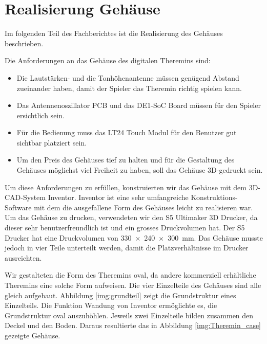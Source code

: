 \clearpage
\section{Realisierung Gehäuse}\label{sec:Realisierung Gehäuse}
Im folgenden Teil des Fachberichtes ist die Realisierung des Gehäuses beschrieben. 

Die Anforderungen an das Gehäuse des digitalen Theremins sind:
\begin{itemize}
	\item Die Lautstärken- und die Tonhöhenantenne müssen genügend Abstand zueinander haben, damit der Spieler das Theremin richtig spielen kann.
	\item Das Antennenoszillator PCB und das DE1-SoC Board müssen für den Spieler ersichtlich sein.
	\item Für die Bedienung muss das LT24 Touch Modul für den Benutzer gut sichtbar platziert sein.
	\item Um den Preis des Gehäuses tief zu halten und für die Gestaltung des Gehäuses möglichst viel Freiheit zu haben, soll das Gehäuse 3D-gedruckt sein.  
\end{itemize}

Um diese Anforderungen zu erfüllen, konstruierten wir das Gehäuse mit dem 3D-CAD-System Inventor. Inventor ist eine sehr umfangreiche Konstruktions-Software mit dem die ausgefallene Form des Gehäuses leicht zu realisieren war.
Um das Gehäuse zu drucken, verwendeten wir den S5 Ultimaker 3D Drucker, da dieser sehr benutzerfreundlich ist und ein grosses Druckvolumen hat. 
Der S5 Drucker hat eine Druckvolumen von \SI{330x240x300}{mm}. 
Das Gehäuse musste jedoch in vier Teile unterteilt werden, damit die Platzverhältnisse im Drucker ausreichten. 

Wir gestalteten die Form des Theremins oval, da andere kommerziell erhältliche Theremins eine solche Form aufweisen. Die vier Einzelteile des Gehäuses sind alle gleich aufgebaut. Abbildung \ref{img:grundteil} zeigt die Grundstruktur eines Einzelteils. Die Funktion Wandung von Inventor ermöglichte es, die Grundstruktur oval auszuhöhlen. Jeweils zwei Einzelteile bilden zusammen den Deckel und den Boden. Daraus resultierte das in Abbildung \ref{img:Theremin_case} gezeigte Gehäuse. 

